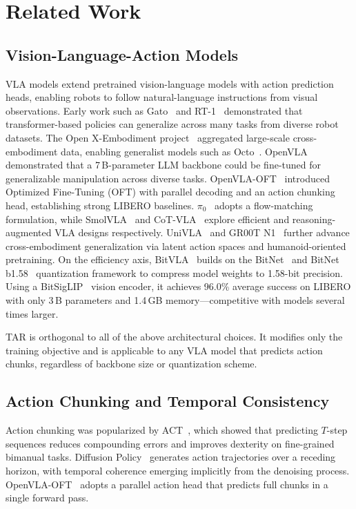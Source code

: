 \section{Related Work}
\label{sec:related}

\subsection{Vision-Language-Action Models}
VLA models extend pretrained vision-language models with action prediction heads, enabling robots to follow natural-language instructions from visual observations. Early work such as Gato~\cite{reed2022gato} and RT-1~\cite{brohan2023rt1} demonstrated that transformer-based policies can generalize across many tasks from diverse robot datasets. The Open X-Embodiment project~\cite{padalkar2023openx} aggregated large-scale cross-embodiment data, enabling generalist models such as Octo~\cite{ghosh2024octo}. OpenVLA~\cite{kim2024openvla} demonstrated that a 7\,B-parameter LLM backbone could be fine-tuned for generalizable manipulation across diverse tasks. OpenVLA-OFT~\cite{kim2025openvlaoft} introduced Optimized Fine-Tuning (OFT) with parallel decoding and an action chunking head, establishing strong LIBERO baselines. $\pi_0$~\cite{black2024pi0} adopts a flow-matching formulation, while SmolVLA~\cite{shukor2025smolvla} and CoT-VLA~\cite{zhao2025cotvla} explore efficient and reasoning-augmented VLA designs respectively. UniVLA~\cite{bu2025univla} and GR00T N1~\cite{nvidia2025groot} further advance cross-embodiment generalization via latent action spaces and humanoid-oriented pretraining. On the efficiency axis, BitVLA~\cite{wang2025bitvla} builds on the BitNet~\cite{wang2023bitnet} and BitNet b1.58~\cite{ma2024bitnet158} quantization framework to compress model weights to 1.58-bit precision. Using a BitSigLIP~\cite{zhai2023siglip} vision encoder, it achieves 96.0\% average success on LIBERO with only 3\,B parameters and 1.4\,GB memory---competitive with models several times larger.

TAR is orthogonal to all of the above architectural choices. It modifies only the training objective and is applicable to any VLA model that predicts action chunks, regardless of backbone size or quantization scheme.

\subsection{Action Chunking and Temporal Consistency}
Action chunking was popularized by ACT~\cite{zhao2023act}, which showed that predicting $T$-step sequences reduces compounding errors and improves dexterity on fine-grained bimanual tasks. Diffusion Policy~\cite{chi2023diffusion} generates action trajectories over a receding horizon, with temporal coherence emerging implicitly from the denoising process. OpenVLA-OFT~\cite{kim2025openvlaoft} adopts a parallel action head that predicts full chunks in a single forward pass.

